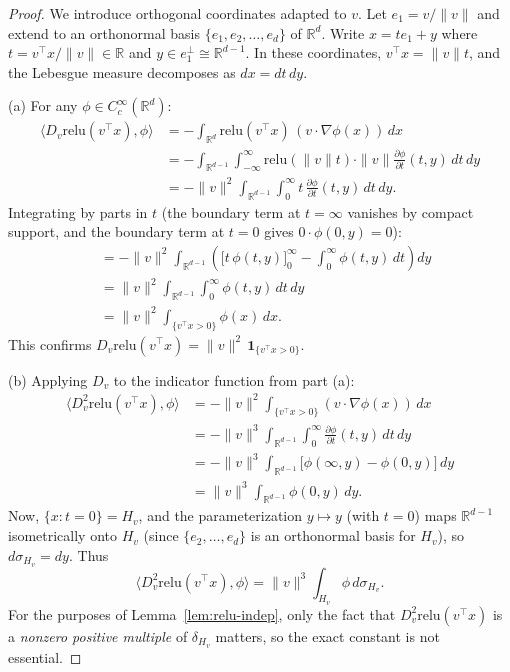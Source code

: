 \documentclass[11pt]{amsart}
\theoremstyle{definition}
\newcommand{\R}{\mathbb{R}}
\newcommand{\inner}[2]{\langle #1, #2 \rangle}
\newcommand{\norm}[1]{\| #1 \|}
\newcommand{\relu}{\mathrm{relu}}
\begin{document}
\begin{proof}
We introduce orthogonal coordinates adapted to $v$. Let $e_1 = v/\norm{v}$ and extend to an orthonormal basis $\{e_1, e_2, \ldots, e_d\}$ of $\R^d$. Write $x = t e_1 + y$ where $t = v^\top x / \norm{v} \in \R$ and $y \in e_1^\perp \cong \R^{d-1}$. In these coordinates, $v^\top x = \norm{v} t$, and the Lebesgue measure decomposes as $dx = dt \, dy$.

\medskip

\noindent (a) For any $\phi \in C_c^\infty(\R^d)$:
\begin{align*}
\inner{D_v \relu(v^\top x)}{\phi}
&= -\int_{\R^d} \relu(v^\top x) \, (v \cdot \nabla \phi(x)) \, dx \\
&= -\int_{\R^{d-1}} \int_{-\infty}^{\infty} \relu(\norm{v} t) \cdot \norm{v} \frac{\partial \phi}{\partial t}(t, y) \, dt \, dy \\
&= -\norm{v}^2 \int_{\R^{d-1}} \int_0^{\infty} t \, \frac{\partial \phi}{\partial t}(t, y) \, dt \, dy.
\end{align*}
Integrating by parts in $t$ (the boundary term at $t = \infty$ vanishes by compact support, and the boundary term at $t = 0$ gives $0 \cdot \phi(0, y) = 0$):
\begin{align*}
&= -\norm{v}^2 \int_{\R^{d-1}} \left( \bigl[t \, \phi(t,y)\bigr]_0^\infty - \int_0^\infty \phi(t,y) \, dt \right) dy \\
&= \norm{v}^2 \int_{\R^{d-1}} \int_0^\infty \phi(t,y) \, dt \, dy \\
&= \norm{v}^2 \int_{\{v^\top x > 0\}} \phi(x) \, dx.
\end{align*}
This confirms $D_v \relu(v^\top x) = \norm{v}^2 \, \mathbf{1}_{\{v^\top x > 0\}}$.

\medskip

\noindent (b) Applying $D_v$ to the indicator function from part (a):
\begin{align*}
\inner{D_v^2 \relu(v^\top x)}{\phi}
&= -\norm{v}^2 \int_{\{v^\top x > 0\}} (v \cdot \nabla \phi(x)) \, dx \\
&= -\norm{v}^3 \int_{\R^{d-1}} \int_0^\infty \frac{\partial \phi}{\partial t}(t,y) \, dt \, dy \\
&= -\norm{v}^3 \int_{\R^{d-1}} \bigl[\phi(\infty, y) - \phi(0, y)\bigr] \, dy \\
&= \norm{v}^3 \int_{\R^{d-1}} \phi(0, y) \, dy.
\end{align*}
Now, $\{x : t = 0\} = H_v$, and the parameterization $y \mapsto y$ (with $t = 0$) maps $\R^{d-1}$ isometrically onto $H_v$ (since $\{e_2, \ldots, e_d\}$ is an orthonormal basis for $H_v$), so $d\sigma_{H_v} = dy$. Thus
\[
\inner{D_v^2 \relu(v^\top x)}{\phi} = \norm{v}^3 \int_{H_v} \phi \, d\sigma_{H_v}.
\]
For the purposes of Lemma~\ref{lem:relu-indep}, only the fact that $D_v^2 \relu(v^\top x)$ is a \emph{nonzero positive multiple} of $\delta_{H_v}$ matters, so the exact constant is not essential.
\end{proof}
\end{document}
